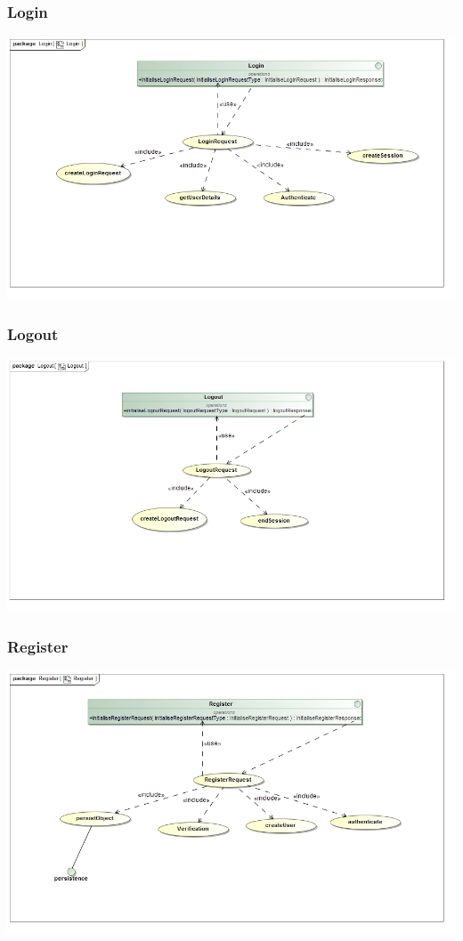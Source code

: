 \documentclass[a4paper,12pt]{article}
\begin{document}
\subsubsection{Login}
\includegraphics[width=1\textwidth]{./Images/processSpecification/Priscilla/Login.jpg}
\subsubsection{Logout}
\includegraphics[width=1\textwidth]{./Images/processSpecification/Priscilla/Logout.jpg}
\subsubsection{Register}
\includegraphics[width=1\textwidth]{./Images/processSpecification/Priscilla/Register.jpg}
\end{document}
